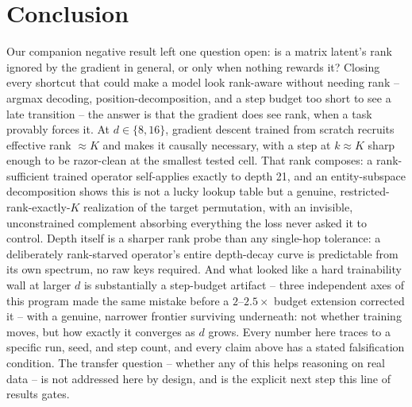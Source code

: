 \section{Conclusion}
\label{sec:conclusion}

Our companion negative result left one question open: is a matrix latent's
rank ignored by the gradient in general, or only when nothing rewards it?
Closing every shortcut that could make a model look rank-aware without
needing rank -- argmax decoding, position-decomposition, and a step budget
too short to see a late transition -- the answer is that the gradient does
see rank, when a task provably forces it. At $d\in\{8,16\}$, gradient
descent trained from scratch recruits effective rank $\approx K$ and makes
it causally necessary, with a step at $k\approx K$ sharp enough to be
razor-clean at the smallest tested cell. That rank composes: a
rank-sufficient trained operator self-applies exactly to depth 21, and an
entity-subspace decomposition shows this is not a lucky lookup table but a
genuine, restricted-rank-exactly-$K$ realization of the target permutation,
with an invisible, unconstrained complement absorbing everything the loss
never asked it to control. Depth itself is a sharper rank probe than any
single-hop tolerance: a deliberately rank-starved operator's entire
depth-decay curve is predictable from its own spectrum, no raw keys
required. And what looked like a hard trainability wall at larger $d$ is
substantially a step-budget artifact -- three independent axes of this
program made the same mistake before a $2$--$2.5\times$ budget extension
corrected it -- with a genuine, narrower frontier surviving underneath: not
whether training moves, but how exactly it converges as $d$ grows. Every
number here traces to a specific run, seed, and step count, and every
claim above has a stated falsification condition. The transfer question --
whether any of this helps reasoning on real data -- is not addressed here
by design, and is the explicit next step this line of results gates.
